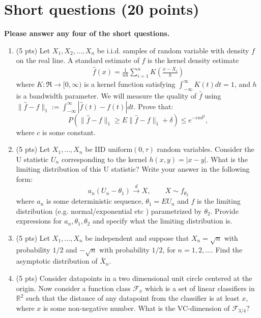 \documentclass[12pt]{article}
\newcommand{\cd}{\stackrel{d}{\rightarrow}}
\begin{document}
	\section{Short questions (20 points)}
	\textbf{Please answer any four of the short questions.}
	\begin{enumerate}	
			\item (5 pts) Let $X_1, X_2, \dots , X_n$ be
		i.i.d. samples of random variable with density $f$ on the real line. A standard estimate
		of $f$ is the kernel density estimate 
		\begin{align*}
		\hat{f}(x)=\frac{1}{nh}\sum_{i=1}^nK\left(\frac{x-X_i}{h}\right)
		\end{align*}
		where $K:\Re\rightarrow [0,\infty)$ is a kernel function satisfying $\int_{-\infty}^\infty K(t)dt=1$, and $h$ is a bandwidth parameter. We will measure the quality of $\hat{f}$ using
		$\|\hat{f}-f\|_1:=\int_{-\infty}^\infty |\hat{f}(t)-f(t)|dt.$
		Prove that:
		$$	P(\|\hat{f}-f\|_1\geq E\|\hat{f}-f\|_1+\delta)\leq e^{-cn\delta^2},$$
		where $c$ is some constant.
	\item (5 pts) 
Let $X_1,\dots,X_n$ be IID $\text{uniform}(0,\tau)$ random variables. Consider the U statistic $U_n$ corresponding to the kernel $h(x,y)=|x-y|$. What is the limiting distribution of this U statistic? Write your answer in the following form:
$$a_n(U_n-\theta_1)\cd X,\qquad X\sim f_{\theta_2}$$
where $a_n$ is some deterministic sequence, $\theta_1=E U_n$ and $f$ is the limiting distribution (e.g. normal/exponential etc ) parametrized by $\theta_2$. Provide expressions for $a_n,\theta_1,\theta_2$ and specify what the limiting distribution is.

\item (5 pts)  Let $X_1,\dots,X_n$ be independent and suppose that $X_n=\sqrt{n}$ with probability $1/2$ and $-\sqrt{n}$ with probability $1/2$, for $n=1,2,\dots$. Find the asymptotic distribution of $\bar{X}_n$. 

\item (5 pts) Consider datapoints in a two dimensional unit circle centered at the origin. Now consider a function class $\mathcal{F}_x$ which is a set of linear classifiers in $\mathbb{R}^2$ such that the distance of any datapoint from the classifier is at least $x$, where $x$ is some non-negative number. What is the VC-dimension of $\mathcal{F}_{3/4}$? 
	



\end{enumerate}
\end{document}
